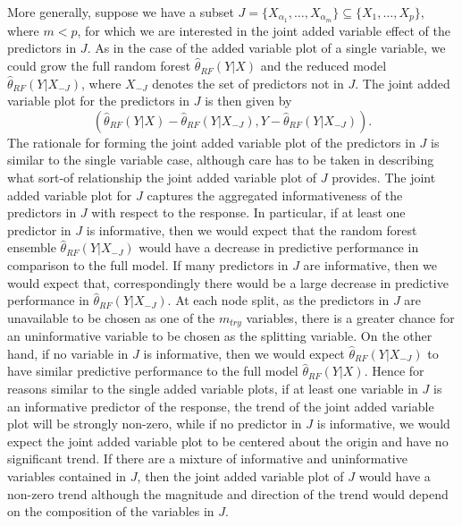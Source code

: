 \documentclass[12pt,twoside]{reedthesis}
\theoremstyle{definition}
\theoremstyle{definition}
\theoremstyle{definition}
\theoremstyle{remark}
\begin{document}
More generally, suppose we have a subset
\(J=\{X_{\alpha_1},\ldots, X_{\alpha_m}\}\subseteq \{X_1,\ldots,X_p\}\),
where \(m< p\), for which we are interested in the joint added variable
effect of the predictors in \(J\). As in the case of the added variable
plot of a single variable, we could grow the full random forest
\(\hat{\theta}_{RF}(Y|X)\) and the reduced model
\(\hat{\theta}_{RF}(Y|X_{-J})\), where \(X_{-J}\) denotes the set of
predictors not in \(J\). The joint added variable plot for the
predictors in \(J\) is then given by
\[(\hat{\theta}_{RF}(Y|X)-\hat{\theta}_{RF}(Y|X_{-J}), Y-\hat{\theta}_{RF}(Y|X_{-J})).\]
The rationale for forming the joint added variable plot of the
predictors in \(J\) is similar to the single variable case, although
care has to be taken in describing what sort-of relationship the joint
added variable plot of \(J\) provides. The joint added variable plot for
\(J\) captures the aggregated informativeness of the predictors in \(J\)
with respect to the response. In particular, if at least one predictor
in \(J\) is informative, then we would expect that the random forest
ensemble \(\hat{\theta}_{RF}(Y|X_{-J})\) would have a decrease in
predictive performance in comparison to the full model. If many
predictors in \(J\) are informative, then we would expect that,
correspondingly there would be a large decrease in predictive
performance in \(\hat{\theta}_{RF}(Y|X_{-J})\). At each node split, as
the predictors in \(J\) are unavailable to be chosen as one of the
\(m_{try}\) variables, there is a greater chance for an uninformative
variable to be chosen as the splitting variable. On the other hand, if
no variable in \(J\) is informative, then we would expect
\(\hat{\theta}_{RF}(Y|X_{-J})\) to have similar predictive performance
to the full model \(\hat{\theta}_{RF}(Y|X)\). Hence for reasons similar
to the single added variable plots, if at least one variable in \(J\) is
an informative predictor of the response, the trend of the joint added
variable plot will be strongly non-zero, while if no predictor in \(J\)
is informative, we would expect the joint added variable plot to be
centered about the origin and have no significant trend. If there are a
mixture of informative and uninformative variables contained in \(J\),
then the joint added variable plot of \(J\) would have a non-zero trend
although the magnitude and direction of the trend would depend on the
composition of the variables in \(J\). \par
\end{document}
